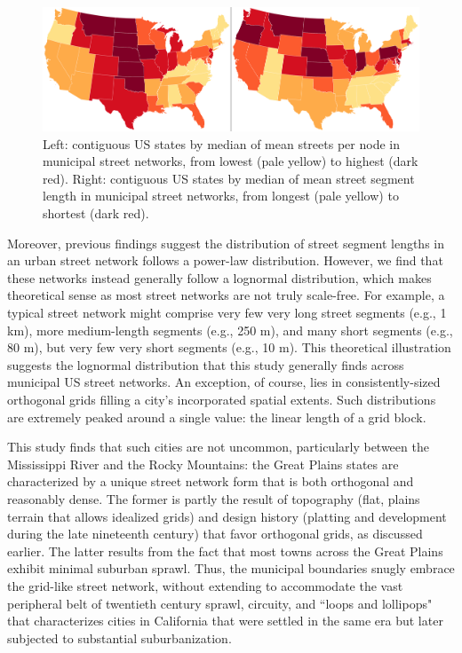 \documentclass{article}
\begin{document}
\begin{figure}[h]
	\includegraphics[width=1\textwidth]{media/fig04.png}
	\caption{Left: contiguous US states by median of mean streets per node in municipal street networks, from lowest (pale yellow) to highest (dark red). Right: contiguous US states by median of mean street segment length in municipal street networks, from longest (pale yellow) to shortest (dark red).}
	\label{fig04}
\end{figure}

Moreover, previous findings \citep[e.g.,][]{masucci_random_2009} suggest the distribution of street segment lengths in an urban street network follows a power-law distribution. However, we find that these networks instead generally follow a lognormal distribution, which makes theoretical sense as most street networks are not truly scale-free. For example, a typical street network might comprise very few very long street segments (e.g., 1 km), more medium-length segments (e.g., 250 m), and many short segments (e.g., 80 m), but very few very short segments (e.g., 10 m). This theoretical illustration suggests the lognormal distribution that this study generally finds across municipal US street networks. An exception, of course, lies in consistently-sized orthogonal grids filling a city's incorporated spatial extents. Such distributions are extremely peaked around a single value: the linear length of a grid block.

This study finds that such cities are not uncommon, particularly between the Mississippi River and the Rocky Mountains: the Great Plains states are characterized by a unique street network form that is both orthogonal and reasonably dense. The former is partly the result of topography (flat, plains terrain that allows idealized grids) and design history (platting and development during the late nineteenth century) that favor orthogonal grids, as discussed earlier. The latter results from the fact that most towns across the Great Plains exhibit minimal suburban sprawl. Thus, the municipal boundaries snugly embrace the grid-like street network, without extending to accommodate the vast peripheral belt of twentieth century sprawl, circuity, and ``loops and lollipops" \cite{southworth_streets_1997} that characterizes cities in California that were settled in the same era but later subjected to substantial suburbanization.
\end{document}
